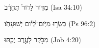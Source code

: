 
\begin{exe}

\ex\label{antdur_Lbegintoend_exs1}
\texthebrew{
מִדֹּ֤ור לָדֹור֙ תֶּחֱרָ֔ב 
} (Isa 34:10)

\ex\label{antdur_Lbegintoend_exs2}
\texthebrew{
בַּשְּׂר֥וּ מִיֹּֽום־לְ֝יֹ֗ום יְשׁוּעָתֹֽו׃ 
} (Ps 96:2)

\ex\label{antdur_Lbegintoend_exs3}
\texthebrew{
מִבֹּ֣קֶר לָעֶ֣רֶב יֻכַּ֑תּוּ 
} (Job 4:20)

\end{exe}
